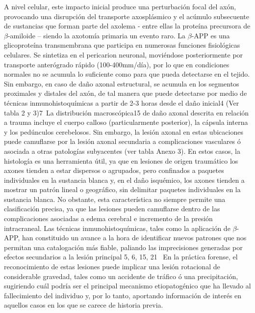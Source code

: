 A nivel celular, este impacto inicial produce una perturbación focal del axón, provocando una disrupción del transporte axosplásmico y el acúmulo subsecuente de sustancias que forman parte del axolema - entre ellas la proteína precursora de $\beta$-amiloide – siendo la axotomía primaria un evento raro. La $\beta$-APP es una glicoproteína transmembrana que participa en numerosas funciones fisiológicas celulares. Se sintetiza en el pericarion neuronal, moviéndose posteriormente por transporte anterógrado rápido (100-400mm/día), por lo que en condiciones normales no se acumula lo suficiente como para que pueda detectarse en el tejido. Sin embargo, en caso de daño axonal estructural, se acumula en los segmentos proximales y distales del axón, de tal manera que puede detectarse por medio de técnicas inmunohistoquímicas a partir de 2-3 horas desde el daño inicial4 (Ver tabla 2 y 3)7\
La distribución macroscópica15 de daño axonal descrita en relación a trauma incluye el cuerpo calloso (particularmente posterior), la cápsula interna y los pedúnculos cerebelosos. Sin embargo, la lesión axonal en estas ubicaciones puede camuflarse por la lesión axonal secundaria a complicaciones vasculares ó asociada a otras patologías subyacentes (ver tabla Anexo 3). En estos casos, la histología es una herramienta útil, ya que en lesiones de origen traumático los axones tienden a estar dispersos o agrupados, pero confinados a paquetes individuales en la sustancia blanca y, en el daño isquémico, los axones tienden a mostrar un patrón lineal o geográfico, sin delimitar paquetes individuales en la sustancia blanca. No obstante, esta característica no siempre permite una clasificación precisa, ya que las lesiones pueden camuflarse dentro de las complicaciones asociadas a edema cerebral e incremento de la presión intracraneal. Las técnicas inmunohistoquímicas, tales como la aplicación de $\beta$-APP, han constituido un avance a la hora de identificar nuevos patrones que nos permitan una catalogación más fiable, paliando las imprecisiones generadas por efectos secundarios a la lesión principal 5, 6, 15, 21 \
En la práctica forense, el reconocimiento de estas lesiones puede implicar una lesión rotacional de considerable gravedad, tales como un accidente de tráfico ó una precipitación, sugiriendo cuál podría ser el principal mecanismo etiopatogénico que ha llevado al fallecimiento del individuo y, por lo tanto, aportando información de interés en aquellos casos en los que se carece de historia previa.\
